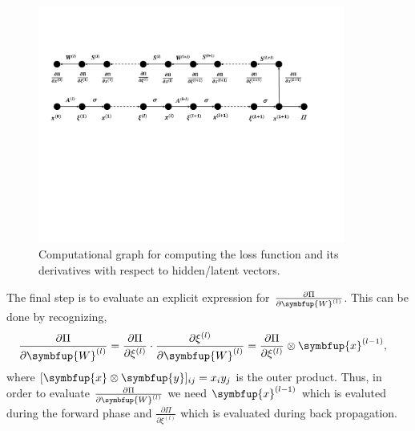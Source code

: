 \documentclass[11pt]{extarticle}
\newcommand{\vx}{\symbfup{x}}
\newcommand{\vy}{\symbfup{y}}
\newcommand{\vW}{\symbfup{W}}
\theoremstyle{definition}
\newcommand{\df}[2]{\frac{\partial #1}{\partial #2}}
\newtheorem{remark}{Remark}%
\begin{document}
\begin{figure}[htbp!]
\begin{center}
\includegraphics[width=0.90\textwidth]{fig/nn/computational_graph.pdf}
\caption{Computational graph for computing the loss function and its derivatives with respect to hidden/latent vectors.}
\label{fig:comp_graph}
\end{center}
\end{figure}

The final step is to evaluate an explicit expression for $\df{\Pi}{\vW^{(l)}}$. This can be done by recognizing,
\begin{align}\label{eqn:bpr1}
  \df{\Pi}{\vW^{(l)}} &= \df{\Pi}{\xi^{(l)}} \cdot \df{ \xi^{(l)} }{\symbfup{W}^{(l)}}  = \df{\Pi}{\xi^{(l)}} \otimes \vx^{(l-1)}, 
\end{align}
where $[\vx \otimes \vy]_{ij} = x_iy_j$  is the outer product. Thus, in order to evaluate $\df{\Pi}{\vW^{(l)}}$ we need $\vx^{(l-1)}$ which is evaluted during the forward phase and $\df{\Pi}{\xi^{(l)}}$ which is evaluated during back propagation. 


\end{document}
